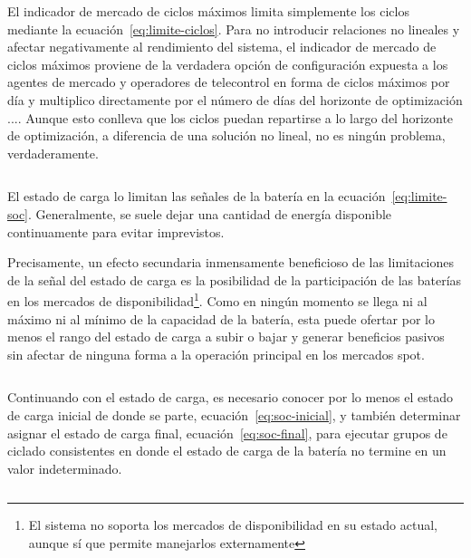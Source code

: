 \begin{equation}
  \label{eq:carga-descarga-simultánea-sos}
\end{equation}

El indicador de mercado de ciclos máximos limita simplemente los ciclos mediante la ecuación~\ref{eq:limite-ciclos}. Para no introducir relaciones no lineales y afectar negativamente al rendimiento del sistema, el indicador de mercado de ciclos máximos proviene de la verdadera opción de configuración expuesta a los agentes de mercado y operadores de telecontrol en forma de ciclos máximos por día y multiplico directamente por el número de días del horizonte de optimización \( ... \). Aunque esto conlleva que los ciclos puedan repartirse a lo largo del horizonte de optimización, a diferencia de una solución no lineal, no es ningún problema, verdaderamente.

\begin{equation}
  \label{eq:limite-ciclos}
\end{equation}

El estado de carga lo limitan las señales de la batería en la ecuación~\ref{eq:limite-soc}. Generalmente, se suele dejar una cantidad de energía disponible continuamente para evitar imprevistos.

Precisamente, un efecto secundaria inmensamente beneficioso de las limitaciones de la señal del estado de carga es la posibilidad de la participación de las baterías en los mercados de disponibilidad\footnote{El sistema no soporta los mercados de disponibilidad en su estado actual, aunque sí que permite manejarlos externamente}. Como en ningún momento se llega ni al máximo ni al mínimo de la capacidad de la batería, esta puede ofertar por lo menos el rango del estado de carga a subir o bajar y generar beneficios pasivos sin afectar de ninguna forma a la operación principal en los mercados spot.

\begin{equation}
  \label{eq:limite-soc}
\end{equation}

Continuando con el estado de carga, es necesario conocer por lo menos el estado de carga inicial de donde se parte, ecuación~\ref{eq:soc-inicial}, y también determinar asignar el estado de carga final, ecuación~\ref{eq:soc-final}, para ejecutar grupos de ciclado consistentes en donde el estado de carga de la batería no termine en un valor indeterminado.

\begin{equation}
  \label{eq:soc-inicial}
\end{equation}


